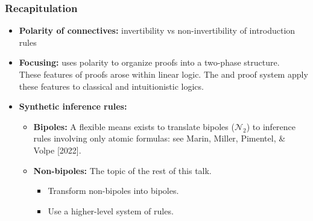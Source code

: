 \documentclass[9pt]{beamer}
\begin{document}
\begin{frame}
\frametitle{Recapitulation}

\begin{itemize}

\item \textbf{Polarity of connectives:} invertibility vs
  non-invertibility of introduction rules\\[10pt]

\item \textbf{Focusing:} uses polarity to organize proofs into a
  two-phase structure.\\[10pt]

  These features of proofs arose within linear logic.  The \LKF and
  \LJF proof system apply these features to classical and
  intuitionistic logics.\\[10pt]

\item \textbf{Synthetic inference rules:}
\pause
  \begin{itemize}
  \item \textbf{Bipoles:} A flexible means exists to translate bipoles
    ($\mathcal{N}_2$) to inference rules involving only atomic
    formulas: see Marin, Miller, Pimentel, \& Volpe [2022].\\[6pt]
\pause

  \item \textbf{Non-bipoles:} The topic of the rest of this talk.
    \begin{itemize}
    \item Transform non-bipoles into bipoles.
    \item Use a higher-level system of rules.
    \end{itemize}
  \end{itemize}

\end{itemize}

\end{frame}
\end{document}
